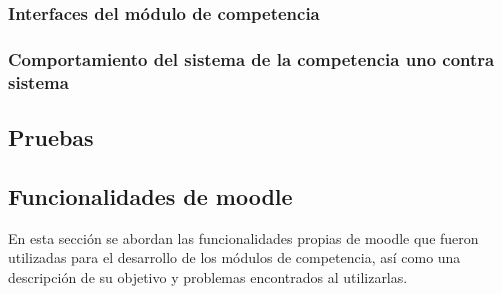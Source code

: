 \subsubsection{Interfaces del módulo de competencia}

    
    
    
    
    
    
    
    
    
    
    
    
    
    
    
     


    

\clearpage
\subsubsection{Comportamiento del sistema de la competencia uno contra sistema}
    

\subsection{Pruebas}

    
    
    
    
    
    
    
    
    
    
    
    
    
    
    
    
    
    

\subsection{Funcionalidades de moodle}

En esta sección se abordan las funcionalidades propias de moodle que fueron utilizadas para el desarrollo
de los módulos de competencia, así como una descripción de su objetivo y problemas encontrados al utilizarlas.\\

  

